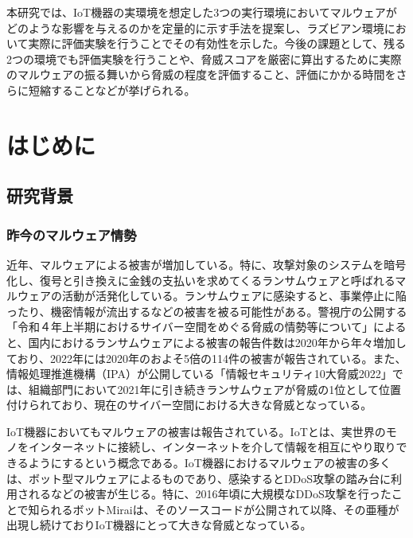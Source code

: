 \documentclass[12pt,a4paper,titlepage,report]{jsbook}
\begin{document}
本研究では、IoT機器の実環境を想定した3つの実行環境においてマルウェアがどのような影響を与えるのかを定量的に示す手法を提案し、ラズビアン環境において実際に評価実験を行うことでその有効性を示した。今後の課題として、残る2つの環境でも評価実験を行うことや、脅威スコアを厳密に算出するために実際のマルウェアの振る舞いから脅威の程度を評価すること、評価にかかる時間をさらに短縮することなどが挙げられる。



\tableofcontents
\listoffigures
\listoftables
\newpage


\pagestyle{plain}




\chapter{はじめに}
\section{研究背景}
\subsection{昨今のマルウェア情勢}
近年、マルウェアによる被害が増加している。特に、攻撃対象のシステムを暗号化し、復号と引き換えに金銭の支払いを求めてくるランサムウェアと呼ばれるマルウェアの活動が活発化している。ランサムウェアに感染すると、事業停止に陥ったり、機密情報が流出するなどの被害を被る可能性がある。警視庁の公開する「令和４年上半期におけるサイバー空間をめぐる脅威の情勢等について」\cite{policereport}によると、国内におけるランサムウェアによる被害の報告件数は2020年から年々増加しており、2022年には2020年のおよそ5倍の114件の被害が報告されている。また、情報処理推進機構（IPA）が公開している「情報セキュリティ10大脅威2022」\cite{bestthreat2022}では、組織部門において2021年に引き続きランサムウェアが脅威の1位として位置付けられており、現在のサイバー空間における大きな脅威となっている。

IoT機器においてもマルウェアの被害は報告されている。IoTとは、実世界のモノをインターネットに接続し、インターネットを介して情報を相互にやり取りできるようにするという概念である。IoT機器におけるマルウェアの被害の多くは、ボット型マルウェアによるものであり、感染するとDDoS攻撃の踏み台に利用されるなどの被害が生じる。特に、2016年頃に大規模なDDoS攻撃を行ったことで知られるボットMiraiは、そのソースコードが公開されて以降、その亜種が出現し続けておりIoT機器にとって大きな脅威となっている。\cite{malwaresurvey}
\end{document}
